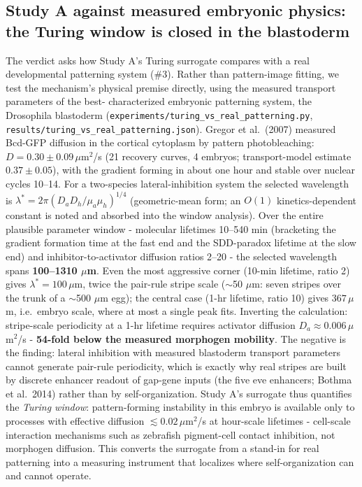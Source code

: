 \documentclass[12pt]{article}
\begin{document}
\subsection{Study A against measured embryonic physics: the Turing window is closed in the blastoderm}
\label{sec:turing-real}
The verdict asks how Study A's Turing surrogate compares with a real developmental
patterning system (\#3). Rather than pattern-image fitting, we test the mechanism's
physical premise directly, using the measured transport parameters of the best-
characterized embryonic patterning system, the Drosophila blastoderm
(\texttt{experiments/turing\_vs\_real\_patterning.py},
\texttt{results/turing\_vs\_real\_patterning.json}). Gregor et al.\ (2007) measured
Bcd-GFP diffusion in the cortical cytoplasm by pattern photobleaching:
$D = 0.30 \pm 0.09\,\mu$m$^2$/s (21 recovery curves, 4 embryos; transport-model
estimate $0.37 \pm 0.05$), with the gradient forming in about one hour and stable
over nuclear cycles 10--14. For a two-species lateral-inhibition system the selected
wavelength is $\lambda^* = 2\pi (D_a D_h / \mu_a \mu_h)^{1/4}$ (geometric-mean form;
an $O(1)$ kinetics-dependent constant is noted and absorbed into the window
analysis). Over the entire plausible parameter window - molecular lifetimes 10--540
min (bracketing the gradient formation time at the fast end and the
SDD-paradox lifetime at the slow end) and inhibitor-to-activator diffusion ratios
2--20 - the selected wavelength spans \textbf{100--1310 $\mu$m}. Even the most
aggressive corner (10-min lifetime, ratio 2) gives $\lambda^* = 100\,\mu$m, twice
the pair-rule stripe scale ($\sim$50 $\mu$m: seven stripes over the trunk of a
$\sim$500 $\mu$m egg); the central case (1-hr lifetime, ratio 10) gives
$367\,\mu$m, i.e.\ embryo scale, where at most a single peak fits. Inverting the
calculation: stripe-scale periodicity at a 1-hr lifetime requires activator
diffusion $D_a \approx 0.006\,\mu$m$^2$/s - \textbf{54-fold below the measured
morphogen mobility}. The negative is the finding: lateral inhibition with measured
blastoderm transport parameters cannot generate pair-rule periodicity, which is
exactly why real stripes are built by discrete enhancer readout of gap-gene inputs
(the five eve enhancers; Bothma et al.\ 2014) rather than by self-organization.
Study A's surrogate thus quantifies the \emph{Turing window}: pattern-forming
instability in this embryo is available only to processes with effective diffusion
$\lesssim 0.02\,\mu$m$^2$/s at hour-scale lifetimes - cell-scale interaction
mechanisms such as zebrafish pigment-cell contact inhibition, not morphogen
diffusion. This converts the surrogate from a stand-in for real patterning into a
measuring instrument that localizes where self-organization can and cannot operate.
\end{document}
